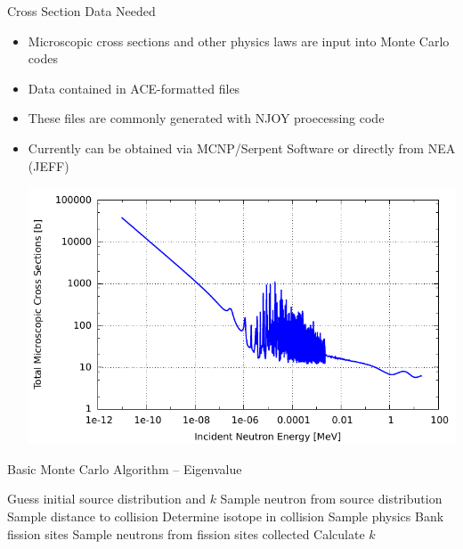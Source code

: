 \documentclass[serif]{beamer}
\begin{document}
\begin{frame}{Cross Section Data Needed}

  \begin{itemize}
    \small
    \item<1-> Microscopic cross sections and other physics laws are input into
              Monte Carlo codes\vfill
    \item<1-> Data contained in ACE-formatted files\vfill
    \item<1-> These files are commonly generated with NJOY proecessing code\vfill
    \item<1-> Currently can be obtained via MCNP/Serpent Software or directly from NEA (JEFF)
    \vfill
    \begin{center}
      \includegraphics[scale=0.55]{../src/U235xs.pdf}
    \end{center}
  \end{itemize}

\end{frame}


\begin{frame}{Basic Monte Carlo Algorithm -- Eigenvalue}
    \begin{algorithmic}
      \State Guess initial source distribution and $k$
            \State Sample neutron from source distribution
              \State Sample distance to collision
              \State Determine isotope in collision
              \State Sample physics
              \State Bank fission sites
            \EndWhile
          \EndFor
          \State Sample neutrons from fission sites collected
          \State Calculate $k$
        \EndFor
    \end{algorithmic}
\end{frame}
\end{document}
